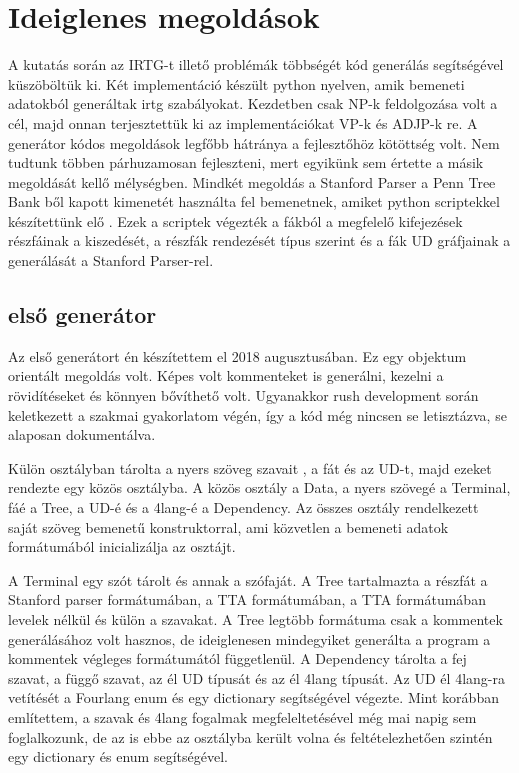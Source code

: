 \section{Ideiglenes megoldások}
A kutatás során az IRTG-t illető problémák többségét kód generálás segítségével küszöböltük ki. Két implementáció készült python nyelven, amik bemeneti adatokból generáltak irtg szabályokat. Kezdetben csak NP-k feldolgozása volt a cél, majd onnan terjesztettük ki az implementációkat VP-k és ADJP-k re. A generátor kódos megoldások legfőbb hátránya a fejlesztőhöz kötöttség volt. Nem tudtunk többen párhuzamosan fejleszteni, mert egyikünk sem értette a másik megoldását kellő mélységben.
Mindkét megoldás a Stanford Parser a Penn Tree Bank ből kapott kimenetét használta fel bemenetnek, amiket python scriptekkel készítettünk elő . Ezek a scriptek végezték a fákból a megfelelő kifejezések részfáinak a kiszedését, a részfák rendezését típus szerint és a fák UD gráfjainak a generálását a Stanford Parser-rel.


\subsection{első generátor}
Az első generátort én készítettem el 2018 augusztusában. Ez egy objektum orientált megoldás volt. Képes volt kommenteket is generálni, kezelni a rövidítéseket és könnyen bővíthető volt. Ugyanakkor  rush development során keletkezett a szakmai gyakorlatom végén, így a kód még nincsen se letisztázva, se alaposan dokumentálva.

Külön osztályban tárolta a nyers szöveg szavait , a fát és  az UD-t, majd ezeket rendezte egy közös osztályba. A közös osztály a Data, a nyers szövegé a Terminal, fáé a Tree, a UD-é és a 4lang-é a Dependency. Az összes osztály rendelkezett saját szöveg bemenetű konstruktorral, ami közvetlen a bemeneti adatok formátumából inicializálja az osztájt.

A Terminal egy szót tárolt és annak a szófaját. A Tree tartalmazta a részfát a Stanford parser formátumában, a TTA formátumában, a TTA formátumában levelek nélkül és külön a szavakat. A Tree legtöbb formátuma csak a kommentek generálásához volt hasznos, de ideiglenesen mindegyiket generálta a program a kommentek végleges formátumától függetlenül. A Dependency tárolta a fej szavat, a függő szavat, az él UD típusát és az él 4lang típusát. Az UD él 4lang-ra vetítését a Fourlang enum és egy dictionary segítségével végezte. Mint korábban említettem, a szavak és 4lang fogalmak megfeleltetésével még mai napig sem foglalkozunk, de az is ebbe az osztályba került volna és feltételezhetően szintén egy dictionary és enum segítségével.

